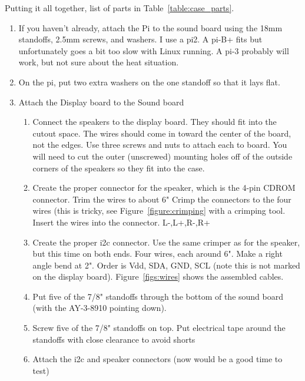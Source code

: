 \documentclass[11pt]{article}
\begin{document}
Putting it all together, list of parts in Table~\ref{table:case_parts}.
\begin{enumerate}

	\item If you haven't already, attach the Pi to the sound board using the 
		18mm standoffs, 2.5mm screws, and washers.
		I use a pi2.
		A pi-B+ fits but unfortunately goes a bit too slow with Linux running.
		A pi-3 probably will work, but not sure about the heat situation.

	\item	On the pi, put two extra washers on the one standoff so that it lays
			flat.

	\item Attach the Display board to the Sound board

		\begin{enumerate}
		
		\item Connect the speakers to the display board.
			They should fit into the cutout space.
			The wires should come in toward the center of the board,
			not the edges.
			Use three screws and nuts to attach each to board.
			You will need to cut the outer (unscrewed) mounting holes
			off of the outside corners of the speakers so they fit into
			the case.

		\item Create the proper connector for the speaker, which is the 4-pin CDROM
			connector.  Trim the wires to about 6"
			Crimp the connectors to the four wires (this is tricky, see
			Figure~\ref{figure:crimping} with a crimping tool.
			Insert the wires into the connector. L-,L+,R-,R+

		\item Create the proper i2c connector.
			Use the same crimper as for the speaker, but this time on both
			ends.  Four wires, each around 6".  Make a right angle bend at 2".
			Order is Vdd, SDA, GND, SCL (note this is not marked on
			the display board).
			Figure~\ref{figs:wires} shows the assembled cables.

		\item Put five of the 7/8" standoffs through the bottom of the sound board
			(with the AY-3-8910 pointing down).

		\item Screw five of the 7/8" standoffs on top.
			Put electrical tape around the standoffs with close clearance
			to avoid shorts

		\item Attach the i2c and speaker connectors (now would be a good time to test)


\end{enumerate}
\end{enumerate}
\end{document}

